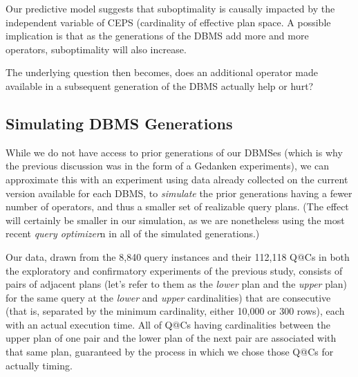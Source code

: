 \documentclass[prodmode,acmtods]{acmsmall}
\begin{document}
Our predictive model suggests that suboptimality is causally
impacted by the independent variable of CEPS (cardinality of effective plan
space. A
possible implication is that as the generations of the \hbox{DBMS} add more and more
operators, suboptimality will also increase. 


The underlying question then becomes, does an additional operator made
available in a subsequent generation of the \hbox{DBMS} actually help or hurt?

\subsection{Simulating \hbox{DBMS} Generations}
While we do not have access to prior generations of our \hbox{DBMSes} (which is why
the previous discussion was in the form of a Gedanken experiments), we can
approximate this with an experiment using data already collected on the
current version available for each \hbox{DBMS}, to {\em simulate} the prior
generations having a fewer number of operators, and thus a smaller set of
realizable query plans. (The effect will certainly be smaller in our
simulation, as we are nonetheless using the most recent {\em query
  optimizer}n in all of the simulated generations.)

Our data, drawn from the 8,840 query instances and their 112,118 Q@Cs in both the
exploratory and confirmatory experiments of the previous study, 
consists of pairs of adjacent plans
(let's refer to them as the {\em lower} plan and the {\em upper} plan) for
the same query at the {\em lower} and {\em upper} cardinalities) that are
consecutive (that is, separated by the minimum cardinality, either 10,000 or
300 rows), each with an actual execution time. All of Q@Cs having
cardinalities between the upper plan of one pair and the lower plan
of the next pair are associated with that same plan, guaranteed by the
process in which we chose those Q@Cs for actually timing.
\end{document}
